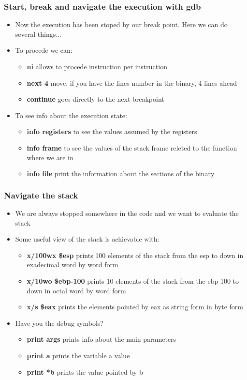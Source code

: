 \documentclass[]{beamer}
\begin{document}
      \begin{frame}
        \frametitle{Start, break and navigate the execution with gdb}
        \begin{itemize}
            \item{Now the execution has been stoped by our break point. Here we can do several things...}
            \item{To procede we can:}
            \begin{itemize}
                \item{{\bf ni} allows to procede instruction per instruction}
                \item{{\bf next 4} move, if you have the lines number in the binary, 4 lines ahead}
                \item{{\bf continue} goes directly to the next breakpoint}
            \end{itemize}
            \item{To see info about the execution state:}
            \begin{itemize}
                \item{{\bf info registers} to see the values assumed by the registers}
                \item{{\bf info frame} to see the values of the stack frame releted to the function where we are in}
                \item{{\bf info file} print the information about the sections of the binary}
            \end{itemize}
        \end{itemize}
      \end{frame}
      \begin{frame}
        \frametitle{Navigate the stack}
        \begin{itemize}
            \item{We are always stopped somewhere in the code and we want to evaluate the stack}
            \item{Some useful view of the stack is achievable with:}
            \begin{itemize}
               \item{{\bf x/100wx \$esp} prints 100 elements of the stack from the esp to down in exadecimal word by word form}
               \item{{\bf x/10wo \$ebp-100} prints 10 elements of the stack from the ebp-100 to down in octal word by word form}
               \item{{\bf x/s \$eax} prints the elements pointed by eax as string form in byte form }
            \end{itemize}
            \item{Have you the debug symbols?}
            \begin{itemize}
                \item{{\bf print args} prints info about the main parameters}
                \item{{\bf print a} prints the variable a value}
                \item{{\bf print *b} prints the value pointed by b}
            \end{itemize}
        \end{itemize}
      \end{frame}
\end{document}

